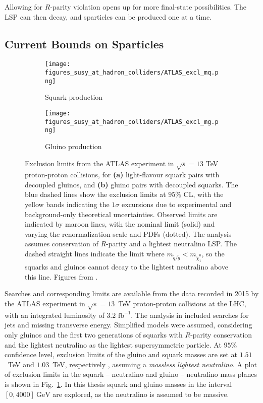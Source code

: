 \documentclass[twoside,english]{uiofysmaster}
\begin{document}
{Allowing for $R$-parity violation opens up for more final-state possibilities. The LSP can then decay, and sparticles can be produced one at a time. 




\subsection{Current Bounds on Sparticles}\label{Sec:: susy hadron : Current Bounds on Sparticles}

\begin{figure}[H]
    \centering
    \begin{subfigure}[b]{0.8\textwidth}
        \texttt{[image: figures\_susy\_at\_hadron\_colliders/ATLAS\_excl\_mq.png]}
        \caption{Squark production}
    \end{subfigure}
    \begin{subfigure}[b]{0.8\textwidth}
        \texttt{[image: figures\_susy\_at\_hadron\_colliders/ATLAS\_excl\_mg.png]}
        \caption{Gluino production}
    \end{subfigure}
    \caption[Exclusion limits for supersymmetry from the ATLAS experiment]{Exclusion limits from the ATLAS experiment in $\sqrt{s} = 13$ TeV proton-proton collisions, for \textbf{(a)} light-flavour squark pairs with decoupled gluinos, and \textbf{(b)} gluino pairs with decoupled squarks. The blue dashed lines show the exclusion limits at $95\%$ CL, with the yellow bands indicating the $1\sigma$ excursions due to experimental and background-only theoretical uncertainties. Observed limits are indicated by maroon lines, with the nominal limit (solid) and varying the renormalization scale and PDFs (dotted). The analysis assumes conservation of $R$-parity and a lightest neutralino LSP. The dashed straight lines indicate the limit where $m_{\widetilde{q}/\widetilde{g}} < m_{\widetilde{\chi}^0_1}$, so the squarks and gluinos cannot decay to the lightest neutralino above this line. Figures from \cite{Aaboud:2016zdn}.}\label{Fig:: susy hadron : ATLAS exclusion limits}
\end{figure}


Searches and corresponding limits are available from the data recorded in 2015 by the ATLAS experiment in $\sqrt{s}=13$~TeV proton-proton collisions at the LHC, with an integrated luminosity of $3.2 \text{ fb}^{-1}$. The analysis in \cite{Aaboud:2016zdn} included searches for jets and missing transverse energy. Simplified models were assumed, considering only gluinos and the first two generations of squarks with $R$-parity conservation and the lightest neutralino as the lightest supersymmetric particle. At $95 \%$ confidence level, exclusion limits of the gluino and squark masses are set at $1.51$~TeV and $1.03$~TeV, respectively \cite{Aaboud:2016zdn}, assuming a \textit{massless lightest neutralino}. A plot of exclusion limits in the squark -- neutralino and gluino -- neutralino mass planes is shown in Fig.\ \ref{Fig:: susy hadron : ATLAS exclusion limits}. In this thesis squark and gluino masses in the interval $[0,4000]~\mathrm{GeV}$ are explored, as the neutralino is assumed to be massive.



}
\end{document}
